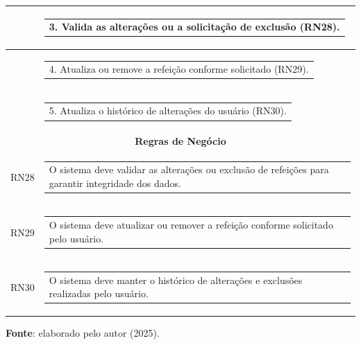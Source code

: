 \begin{longtable}[c]{|p{}|p{}|}
\multicolumn{1}{|p{0.48\textwidth}|}{} &
  \begin{tabular}[c]{@{}p{}@{}}3. Valida as alterações ou a solicitação de exclusão (RN28).\end{tabular} \\ \hline
\multicolumn{1}{|p{0.48\textwidth}|}{} &
  \begin{tabular}[c]{@{}p{}@{}}4. Atualiza ou remove a refeição conforme solicitado (RN29).\end{tabular} \\ \hline
\multicolumn{1}{|p{0.48\textwidth}|}{} &
  \begin{tabular}[c]{@{}p{}@{}}5. Atualiza o histórico de alterações do usuário (RN30).\end{tabular} \\ \hline
\multicolumn{2}{|c|}{\textbf{Regras de Negócio}} \\ \hline
\multicolumn{1}{|p{0.48\textwidth}|}{RN28} &
  \begin{tabular}[c]{@{}p{}@{}}O sistema deve validar as alterações ou exclusão de refeições para garantir integridade dos dados.\end{tabular} \\ \hline
\multicolumn{1}{|p{0.48\textwidth}|}{RN29} &
  \begin{tabular}[c]{@{}p{}@{}}O sistema deve atualizar ou remover a refeição conforme solicitado pelo usuário.\end{tabular} \\ \hline
\multicolumn{1}{|p{0.48\textwidth}|}{RN30} &
  \begin{tabular}[c]{@{}p{}@{}}O sistema deve manter o histórico de alterações e exclusões realizadas pelo usuário.\end{tabular} \\ \hline
\end{longtable}
\begin{center}
    \small{\textbf{Fonte}: elaborado pelo autor (2025).}
\end{center}
